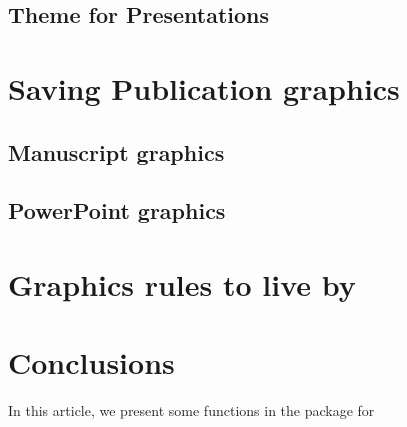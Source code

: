 \documentclass[nojss]{jss}\usepackage[]{graphicx}\usepackage[]{color}
\begin{document}
\subsection{Theme for Presentations}

\section{Saving Publication graphics}\label{S:saving}

\subsection{Manuscript graphics}

\subsection{PowerPoint graphics}

\section{Graphics rules to live by}\label{S:rules}

\section{Conclusions} \label{S:concl}
In this article, we present some functions in the  package for  



\end{document}
